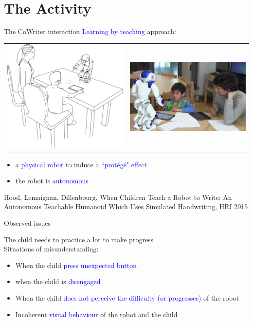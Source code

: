 \documentclass[compress]{beamer}
\renewcommand{\bf}{\Medium}
\begin{document}
\section*{The Activity}
\begin{frame}{The CoWriter interaction}
    \centering
    \textcolor{blue}{Learning by teaching} approach:
    \begin{tabular}{c c}
    \includegraphics[width=0.5\columnwidth]{experimental_setup}
    &
    \includegraphics[width=0.45\columnwidth]{realSetup}
    \end{tabular}
    \begin{itemize}
    \item a \textcolor{blue}{physical robot} to induce a \textcolor{blue}{``prot\'eg\'e" effect}
    \item the robot is \textcolor{blue}{autonomous}
    \end{itemize}
\tiny{Hood, Lemaignan, Dillenbourg, {\bf When Children Teach a Robot to Write: An Autonomous Teachable Humanoid Which Uses Simulated Handwriting}, HRI 2015}\\
\end{frame}

\begin{frame}{Observed issues}

{\bf The child needs to practice a lot to make progress}\\
{\bf Situations of misunderstanding}:
\begin{itemize}
\item When the child \textcolor{blue}{press unexpected button}
\item when the child is \textcolor{blue}{disengaged}
\item When the child \textcolor{blue}{does not perceive the difficulty (or progresses)} of the robot 
\item Incoherent \textcolor{blue}{visual behaviour} of the robot and the child 
\end{itemize}
\end{frame}
\end{document}
